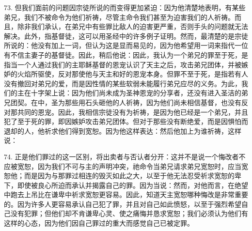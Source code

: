 73. 但我们面前的问题因宗徒所说的而变得更加紧迫：因为他清楚地表明，有某些弟兄，我们不被命令为他们祈祷，尽管主命令我们甚至为迫害我们的人祈祷。而且，除非我们承认，在弟兄中有些罪比敌人的迫害更严重，否则手头的问题就无法解决。此外，指基督徒，这可以用圣经中的许多例子证明。然而，最清楚的是宗徒所说的：他没有加上一词，但认为这是显而易见的，因为他希望用一词来指代一位有不信主妻子的基督徒。因此，稍后他说：因此，我认为一个弟兄的罪至于死，是指当一个人通过我们的主耶稣基督的恩宠认识了天主之后，攻击弟兄团体，并被嫉妒的火焰所驱使，反对那使他与天主和好的恩宠本身。但罪不至于死，是指若有人没有撤回对弟兄的爱，而是因性情的某些软弱未能履行弟兄应尽的义务。为此，我们的主在十字架上说：因为他们尚未成为圣神恩宠的分享者，还没有进入圣洁的弟兄团契。在中，圣为那些用石头砸他的人祈祷，因为他们尚未相信基督，也没有反对那共同的恩宠。因此，我相信宗徒没有为祈祷，是因为他已经是一个弟兄，并且犯了至于死的罪，即因嫉妒攻击弟兄团体。但对于那些没有断绝爱，而是因惧怕而退却的人，他祈求他们得到宽恕。因为他这样表达：然后他加上为谁祈祷，这样说：\par

74. 正是他们罪过的这一区别，将出卖者与否认者分开：这并不是说一个悔改者不应被宽恕，因为我们不可与主的声明冲突，祂命令当弟兄请求弟兄宽恕时，应当宽恕他；而是因为与那罪过相连的毁灭如此之大，以至于他无法忍受祈求宽恕的卑下，即使被良心所迫而承认并揭露自己的罪。因为当说：然而，对他而言，在绝望中跑去上吊比在谦卑中祈求宽恕更容易。因此，知道天主宽恕哪种悔改是非常重要的。因为许多人更容易承认自己犯了罪，并且对自己如此愤怒，以至于强烈希望自己没有犯罪；但他们却不肯谦卑心灵、使之痛悔并恳求宽恕；我们必须认为他们有这样的心态，因为他们因自己罪过的重大而感觉自己已被定罪。\par

